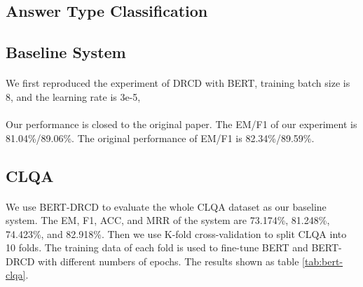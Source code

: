 \documentclass{article}
\begin{document}
\subsection{Answer Type Classification}
\paragraph{}


\subsection{Baseline System}
\paragraph{}
We first reproduced the experiment of DRCD with BERT, training batch size is 8, and the learning rate is 3e-5,

\paragraph{}
Our performance is closed to the original paper. The EM/F1 of our experiment is 81.04\%/89.06\%. The original performance of EM/F1 is 82.34\%/89.59\%.

\subsection{CLQA}
\paragraph{}
We use BERT-DRCD to evaluate the whole CLQA dataset as our baseline system. The EM, F1, ACC, and MRR of the system are 73.174\%, 81.248\%, 74.423\%, and 82.918\%. Then we use K-fold cross-validation to split CLQA into 10 folds. The training data of each fold is used to fine-tune BERT and BERT-DRCD with different numbers of epochs. The results shown as table \ref{tab:bert-clqa}.
\end{document}
